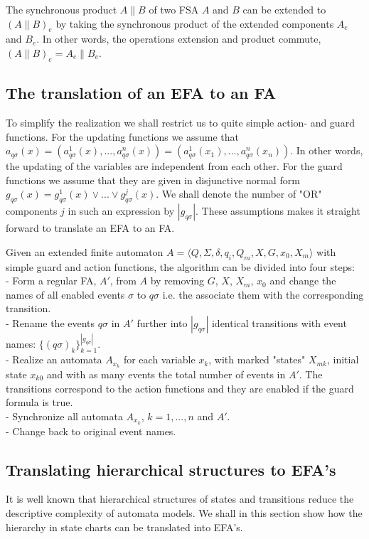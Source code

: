 \documentclass{article}
\begin{document}
The synchronous product $A\|B$ of two FSA $A$ and $B$ can be
extended to $(A\|B)_e$ by taking the synchronous product of the
extended components  $A_e$ and $B_e$. In other words, the
operations extension and product commute, $(A\|B)_e=A_e\|B_e$.

\subsection{The translation of an EFA to  an FA}
To simplify the realization we shall restrict us to quite simple
action- and guard functions. For the updating functions we assume
that $a_{q \sigma}(x)=(a^1_{q \sigma}(x),...,a^n_{q
\sigma}(x))=(a^1_{q \sigma}(x_1),...,a^n_{q \sigma}(x_n))$. In
other words, the updating of the variables are independent from
each other. For the guard functions we assume that they are given
in disjunctive normal form $g_{q \sigma}(x)=g^1_{q \sigma}(x)\vee
...\vee g^j_{q \sigma}(x)$. We shall denote the number of "OR"
components $j$ in such an expression by $|g_{q \sigma}|$. These
assumptions makes it straight forward to translate an EFA to an
FA.

Given an extended finite automaton $A=\langle Q, \Sigma, \delta,
q_i, Q_m, X, G ,x_0, X_m \rangle$ with simple guard and action
functions, the algorithm can be divided into four steps:\\
- Form a regular FA, $A'$, from $A$ by removing $G$, $X$, $X_m$,
$x_0$ and change the names of all enabled events $\sigma$ to
$q\sigma$ i.e. the associate them with the corresponding
transition.\\
- Rename the events $q\sigma$ in $A'$ further into $|g_{q \sigma}|$ identical transitions with event names: $\{(q\sigma)_k\}^{|g_{q \sigma}|}_{k=1}$.\\
- Realize an automata $A_{x_k}$ for each variable $x_k$, with
marked "states" $X_{mk}$, initial state $x_{k 0}$ and with as many events the total number of events in $A'$.
The transitions correspond to the action functions and they are enabled if the guard formula is true.\\
- Synchronize all automata $A_{x_k}$, $k=1,...,n$ and $A'$.\\
- Change back to original event names.
\newpage
\subsection{Translating hierarchical structures to EFA's}
It is well known that hierarchical structures of states and
transitions reduce the descriptive complexity of automata models.
We shall in this section show how the hierarchy in state charts
can be translated into EFA's.
\end{document}
